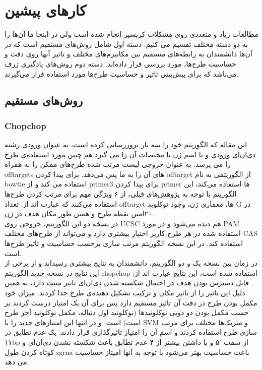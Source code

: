 \documentclass[12pt,a4paper,BCOR=.7cm,headsepline,bibliography=totoc]{report}
\begin{document}
\chapter{کارهای پیشین}
مطالعات زیاد و متعددی روی مشکلات کریسپر انجام شده است ولی در اینجا ما آن‌ها را به دو دسته مختلف تقسیم می کنیم. دسته اول شامل روش‌های مستقیم است که در آن‌ها دانشمندان به رابطه‌های مستقیم بین مکانیزم‌های مختلف و تاثیر آنها روی دقت و حساسیت طرح‌ها، مورد بررسی قرار داده‌اند. دسته دوم روش‌های یادگیری ژرف می‌باشد که برای پیش‌بینی تاثیر و حساسیت طرح‌ها مورد استفاده قرار می‌گیرند.
\section{روش‌های مستقیم}
\subsection{Chopchop ~\cite{CHOPCHOP3,CHOPCHOP2,CHOPCHOP}}
این مقاله که الگوریتم خود را سه بار بروزرسانی کرده است، به عنوان ورودی رشته دی‌ان‌ای ورودی و یا اسم ژن یا مختصات آن را می گیرد هم چنین مورد استفاده‌ی طرح را می پرسد. به عنوان خروجی لیست مرتب شده طرح‌های ممکن را به همراه offtargets های آن را به ما پس می‌دهد. برای پیدا کردن offtarget از الگوریتمی به نام bowtie استفاده می کند و از primer3 برای پیدا کردن primer ها استفاده می‌کند، این الگوریتم با توجه به پژوهش‌های قبلی، از ۶ ویژگی مهم برای مرتب کردن طرح‌ها استفاده می‌کنند که عبارت اند از: تعداد offtarget ها، معماری ژن،  وجود نوکلوید G در ۲۰امین نقطه طرح و همین طور مکان هدف در ژن. \\
در نسخه دو این الگوریتم، خروجی روی UCSC هم دیده می‌شود و در مورد PAM استفاده شده در هر طرح کاربر اختیار بیشتری دارد و می‌تواند از طرح‌های مختلف CAS استفاده کند. در این نسخه الگوریتم مرتب سازی برحسب حساسیت و تاثیر طرح‌ها است.\\
در زمان بین نسخه یک و دو الگوریتم، دانشمندان به نتایج بیشتری رسیداند و از برخی از این نتایج در نسخه جدید الگوریتم chopchop استفاده شده است، این نتایج عبارت اند از: قابل دسترس بودن هدف در احتمال شکسته شدن دی‌ان‌ای تاثیر مثبت دارد، به همین دلیل این تاثیر را از تاثیر مکان و ترکیب تشکیل دهنده‌ی طرح جدا کردند.
میزان خود مکمل بودن طرح در دقت آن تاثیر مستقیم دارد پس برای آن یک امتیاز درست کردند بر حسب مکمل بودن دو دویی نوکلوتید‌ها (نوکلوتید اول دنباله، مکمل نوکلوتید آخر طرح است) است. و در انتها این امتیاز‌های جدید را با SVM و متریک‌ها مختلف برای مرتب سازی طرح استفاده کردند و اسم آن را امتیاز تاثیرگذاری قرار دادند.
یک عدم تطابق در ۱۱bp از سمت ‍'۵ و یا داشتن بیشتر از ۴ عدم تطابق باعث شکسته نشدن دی‌ان‌ای و کوتاه کردن طول sgrna باعث حساسیت بهتر می‌شود با توجه به آنها امیتاز حساسیت می دهد.
\end{document}
